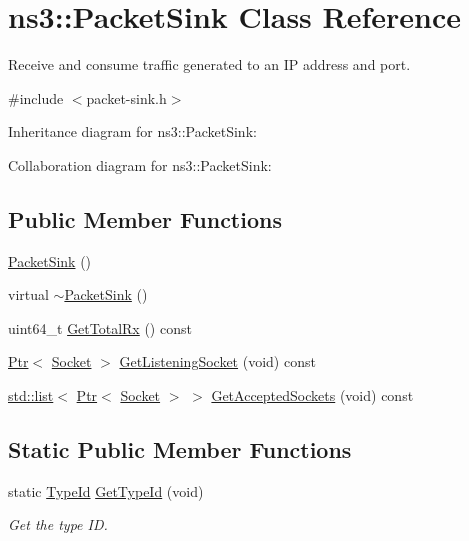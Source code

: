 \hypertarget{classns3_1_1PacketSink}{}\section{ns3\+:\+:Packet\+Sink Class Reference}
\label{classns3_1_1PacketSink}


Receive and consume traffic generated to an IP address and port.  




{\ttfamily \#include $<$packet-\/sink.\+h$>$}



Inheritance diagram for ns3\+:\+:Packet\+Sink\+:


Collaboration diagram for ns3\+:\+:Packet\+Sink\+:
\subsection*{Public Member Functions}
\begin{DoxyCompactItemize}
\item 
\hyperlink{classns3_1_1PacketSink_af7575e499def16f611c8678c2f3ff084}{Packet\+Sink} ()
\item 
virtual \hyperlink{classns3_1_1PacketSink_af3dbfb8f7ffb163e0b0241798a8abb1e}{$\sim$\+Packet\+Sink} ()
\item 
uint64\+\_\+t \hyperlink{classns3_1_1PacketSink_a11e7c4cc4a3c1e16e9abbb2cd3a12334}{Get\+Total\+Rx} () const 
\item 
\hyperlink{classns3_1_1Ptr}{Ptr}$<$ \hyperlink{classns3_1_1Socket}{Socket} $>$ \hyperlink{classns3_1_1PacketSink_a8da15152b90590e91aa2013628f73a45}{Get\+Listening\+Socket} (void) const 
\item 
\hyperlink{openflow-interface_8h_afd9bcfa176617760671b67580f536fa7}{std\+::list}$<$ \hyperlink{classns3_1_1Ptr}{Ptr}$<$ \hyperlink{classns3_1_1Socket}{Socket} $>$ $>$ \hyperlink{classns3_1_1PacketSink_a0402d1351db6f28268c4128b0233bb8a}{Get\+Accepted\+Sockets} (void) const 
\end{DoxyCompactItemize}
\subsection*{Static Public Member Functions}
\begin{DoxyCompactItemize}
\item 
static \hyperlink{classns3_1_1TypeId}{Type\+Id} \hyperlink{classns3_1_1PacketSink_a1e48dd11e1375c234e0276b00919900e}{Get\+Type\+Id} (void)
\begin{DoxyCompactList}\small\item\em Get the type ID. \end{DoxyCompactList}\end{DoxyCompactItemize}
